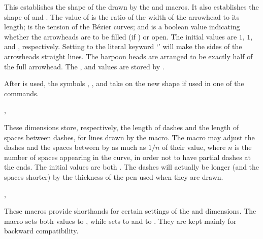 \documentclass[letterpaper]{article}
\begin{document}
\begin{cd}
%
\end{cd}

This establishes the shape of the  drawn by the
 and  macros. It also establishes the shape of
 and . The value of  is
the ratio of the width of the arrowhead to its length;  is
the tension of the B\'ezier curves; and  is a \MF{} boolean
value indicating whether the arrowheads are to be filled (if )
or open. The initial values are $1$, $1$, and , respectively.
Setting  to the literal keyword `' will make
the sides of the arrowheads straight lines. The harpoon heads are
arranged to be exactly half of the full arrowhead. The ,
 and  values are stored by \MF{}.

After  is used, the symbols ,
, and  take on the new shape if used
in one of the  commands.

\begin{cd}
, %
\end{cd}

These dimensions store, respectively, the length of dashes and the
length of spaces between dashes, for lines drawn by the 
macro. The  macro may adjust the dashes and the spaces
between by as much as $1/n$ of their value, where $n$ is the number of
spaces appearing in the curve, in order not to have partial dashes at
the ends. The initial values are both \dim{4pt}. The dashes will
actually be longer (and the spaces shorter) by the thickness of the pen
used when they are drawn.

\begin{cd}
, %
%
\end{cd}

These macros provide shorthands for certain settings of the 
and  dimensions. The macro  sets both
values to \dim{4pt}, while  sets  to
\dim{1pt} and  to \dim{2pt}. They are kept mainly for
backward compatibility.
\end{document}

